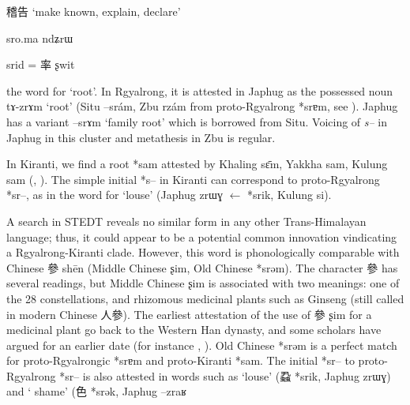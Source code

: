 \documentclass[oldfontcommands,oneside,a4paper,11pt]{article}
\newcommand{\ipa}[1]{{\phon #1}} %
\newcommand{\zh}[1]{{\cn #1}}
\begin{document}
\zh{稽告} `make known, explain, declare' 

\citet{matisoff03}



\ipa{sro.ma}  \ipa{ndʑrɯ}

\ipa{srid} = \zh{率} ʂwit



the word for `root'. In Rgyalrong, it is attested in Japhug as the possessed noun \ipa{tɤ-zrɤm} `root' (Situ \ipa{--srám}, Zbu \ipa{rzám} from proto-Rgyalrong *\ipa{srɐm}, see \citealt[243]{jacques04these}). Japhug has a variant \ipa{--srɤm} `family root' which is borrowed from Situ. Voicing of \textit{s--} in Japhug in this cluster and metathesis in Zbu is regular.

In Kiranti, we find a root *sam attested by Khaling \ipa{sɛ̄m}, Yakkha  \ipa{sam}, Kulung \ipa{sam} (\citealt{kongren07yakkha}, \citealt{tolsma06kulung}). The simple initial *s-- in Kiranti can correspond to proto-Rgyalrong *sr--, as in the word for `louse' (Japhug \ipa{zrɯɣ} $\leftarrow$ *srik, Kulung \ipa{si}).

A search in STEDT reveals no similar form in any other Trans-Himalayan language; thus, it could appear to be a potential common innovation vindicating a Rgyalrong-Kiranti clade. However, this word is phonologically comparable with Chinese \zh{參} shēn (Middle Chinese \ipa{ʂim}, Old Chinese *srəm). The character  \zh{參} has several readings, but Middle Chinese \ipa{ʂim} is associated with two meanings: one of the 28 constellations, and rhizomous medicinal plants such as Ginseng (still called in modern Chinese \zh{人參}). The earliest attestation of the use of \zh{參} \ipa{ʂim} for a medicinal plant go back to the Western Han dynasty, and some scholars have argued for an earlier date (for instance \citealt{xu11shen}, \citealt{sun92renshen}). Old Chinese *srəm is a perfect match for proto-Rgyalrongic *srɐm and proto-Kiranti *sam. The initial *sr-- to proto-Rgyalrong *sr-- is also attested in words such as `louse' (\zh{蝨} *srik, Japhug \ipa{zrɯɣ}) and ` shame' (\zh{色} *srək, Japhug \ipa{--zraʁ}




\end{document}
